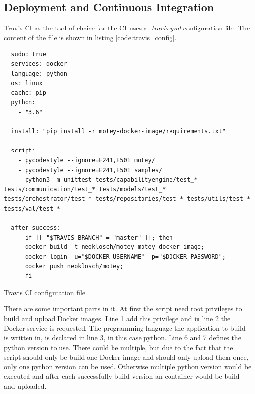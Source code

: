 \subsection{Deployment and Continuous Integration}
Travis CI as the tool of choice for the \ac{CI} uses a \textit{.travis.yml} configuration file.
The content of the file is shown in listing \ref{code:travis_config}.\newline

\begin{listing}[H]
  \begin{verbatim}
  sudo: true
  services: docker
  language: python
  os: linux
  cache: pip
  python:
    - "3.6"

  install: "pip install -r motey-docker-image/requirements.txt"

  script:
    - pycodestyle --ignore=E241,E501 motey/
    - pycodestyle --ignore=E241,E501 samples/
    - python3 -m unittest tests/capabilityengine/test_* tests/communication/test_* tests/models/test_* tests/orchestrator/test_* tests/repositories/test_* tests/utils/test_* tests/val/test_*

  after_success:
    - if [[ "$TRAVIS_BRANCH" = "master" ]]; then
      docker build -t neoklosch/motey motey-docker-image;
      docker login -u="$DOCKER_USERNAME" -p="$DOCKER_PASSWORD";
      docker push neoklosch/motey;
      fi
  \end{verbatim}
  \caption{Travis CI configuration file}
  \label{code:travis_config}
\end{listing}

There are some important parts in it.
At first the script need root privileges to build and upload Docker images.
Line 1 add this privilege and in line 2 the Docker service is requested.
The programming language the application to build is written in, is declared in line 3, in this case python.
Line 6 and 7 defines the python version to use.
There could be multiple, but due to the fact that the script should only be build one Docker image and should only upload them once, only one python version can be used.
Otherwise multiple python version would be executed and after each successfully build version an container would be build and uploaded.\newline

